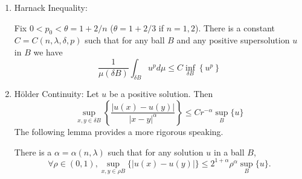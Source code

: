 \begin{enumerate}[label = \arabic*.]
	\item Harnack Inequality:
	\begin{thm}
		Fix $0<p_0<\theta=1+2 / n$ ($\theta = 1 + 2/3$ if $n=1,2$). There is a constant $C = C(n,\lambda,\delta,p)$ such that for any ball $B$ and any positive supersolution $u$ in $B$ we have
		\begin{equation*}
			\frac{1}{\mu(\delta B)} \int_{\delta B} u^p d \mu \leq C \inf _{\delta B}\left\{u^p\right\}
		\end{equation*}
	\end{thm}

	\item H\"older Continuity: Let $u$ be a positive solution. Then
	\begin{equation*}
		\sup _{x, y \in \delta B}\left\{\frac{|u(x)-u(y)|}{|x-y|^\alpha}\right\} \leq C r^{-\alpha} \sup _B\{u\}
	\end{equation*}
	The following lemma provides a more rigorous speaking.
	\begin{lem}
		There is a $\alpha = \alpha(n,\lambda)$ such that for any solution $u$ in a ball $B$,
		\begin{equation*}
			\forall \rho \in(0,1), \sup _{x, y \in \rho B}\{|u(x)-u(y)|\} \leq 2^{1+\alpha} \rho^\alpha \sup _B\{u\} .
		\end{equation*}
	\end{lem}
\end{enumerate}
